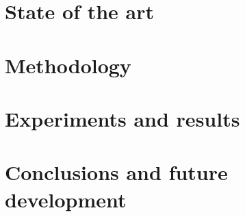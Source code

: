 \documentclass[a4paper,12pt,titlepage,twoside]{article}
\begin{document}
\section{State of the art}


\section{Methodology}


\section{Experiments and results}


\section{Conclusions and future development}


\printbibheading
\printbibliography
\end{document}
